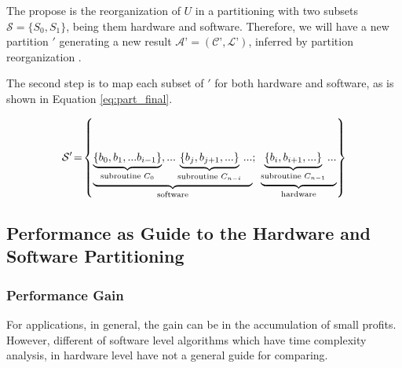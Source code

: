         
        \makeatletter
        \def\@eqnnum{{\normalsize \normalcolor (\theequation)}}
        \makeatother
        
        The propose is the reorganization of $ U $ in a partitioning with two subsets $ \mathcal{S} = \{S_0, S_1\} $, being them hardware and software.
        Therefore, we will have a new partition \Ss$ ' $ generating a new result $ \mathcal{A}’ = (\mathcal{C}’, \mathcal{L}’) $, inferred by partition reorganization \Ss.
        
        The second step is to map each subset of \Ss$ ' $ for both hardware and software, as is shown in Equation \ref{eq:part_final}.
        
        { \small
        \begin{equation}
        \mathcal{S}'\!=\!\left \{
        \underbrace{
        \underbrace{
        \left \{ b_0, b_1, ... b_{i-1} \right \}
        }_{\textnormal{subroutine }C_0},
        ...
        \underbrace{
        \left \{ b_j, b_{j+1}, ... \right \}
        }_{\textnormal{subroutine }C_{n-i}}
        ...
        }_{\textnormal{software}};
        \ 
        \underbrace{
        \underbrace{
        \left \{ b_i, b_{i+1}, ... \right \}
        }_{\textnormal{subroutine }C_{n-1}}
        ...
        }_{\textnormal{hardware}}
        \right \} \label{eq:part_final}
        \end{equation}
        }
        
    
    
    \subsection{Performance as Guide to the Hardware and Software Partitioning} \label{sec:ganho_performance}
        \subsubsection{Performance Gain}
        
            For applications, in general, the gain can be in the accumulation of small profits.
            However, different of software level algorithms which have time complexity analysis, in hardware level have not a general guide for comparing.
            
